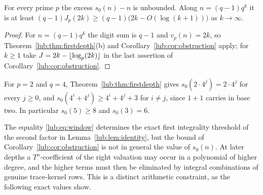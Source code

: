 \begin{corollary}\label{lub:cor:excess}
For every prime $p$ the excess $s_0(n)-n$ is unbounded. Along $n=(q-1)q^k$ it is at least
$(q-1)J_p(2k)\ge(q-1)\bigl(2k-O(\log(k+1))\bigr)$ as $k\to\infty$.
\end{corollary}
\begin{proof}
For $n=(q-1)q^k$ the digit sum is $q-1$ and $v_p(n)=2k$, so
Theorem~\ref{lub:thm:firstdepth}(b) and Corollary~\ref{lub:cor:obstruction} apply; for $k\ge1$ take
$J=2k-\lfloor\log_p(2k)\rfloor$ in the last assertion of Corollary~\ref{lub:cor:obstruction}.
\end{proof}

For $p=2$ and $q=4$, Theorem~\ref{lub:thm:firstdepth} gives $s_0(2\cdot4^j)=2\cdot4^j$ for every
$j\ge0$, and $s_0(4^i+4^j)\ge4^i+4^j+3$ for $i\ne j$, since $1+1$ carries in base two. In
particular $s_0(5)\ge8$ and $s_0(3)=6$.

The equality \eqref{lub:eq:window} determines the exact first integrality threshold of the
second factor in Lemma~\ref{lub:lem:identity}, but the bound of Corollary~\ref{lub:cor:obstruction} is
not in general the value of $s_0(n)$. At later depths a $T^n$-coefficient of the right
valuation may occur in a polynomial of higher degree, and the higher terms must then be
eliminated by integral combinations of genuine trace-kernel rows. This is a distinct
arithmetic constraint, as the following exact values show.

